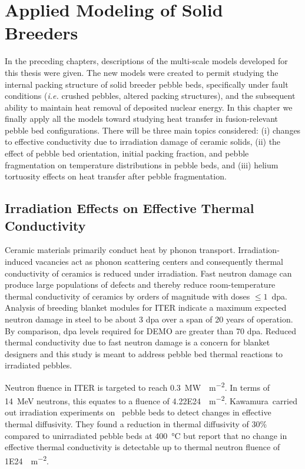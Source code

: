 \chapter{Applied Modeling of Solid Breeders}\label{sec:dem-studies}

In the preceding chapters, descriptions of the multi-scale models developed for this thesis were given. The new models were created to permit studying the internal packing structure of solid breeder pebble beds, specifically under fault conditions (\textit{i.e.} crushed pebbles, altered packing structures), and the subsequent ability to maintain heat removal of deposited nuclear energy. In this chapter we finally apply all the models toward studying heat transfer in fusion-relevant pebble bed configurations. There will be three main topics considered: (i) changes to effective conductivity due to irradiation damage of ceramic solids, (ii) the effect of pebble bed orientation, initial packing fraction, and pebble fragmentation on temperature distributions in pebble beds, and (iii) helium tortuosity effects on heat transfer after pebble fragmentation. 


\section{Irradiation Effects on Effective Thermal Conductivity}\label{sec:irradiation}
Ceramic materials primarily conduct heat by phonon transport. Irradiation-induced vacancies act as phonon scattering centers and consequently thermal conductivity of ceramics is reduced under irradiation.\cite{Hopkins1985} Fast neutron damage can produce large populations of defects and thereby reduce room-temperature thermal conductivity of ceramics by orders of magnitude with doses $\le 1$~dpa.\cite{Snead2005} Analysis of breeding blanket modules for ITER indicate a maximum expected neutron damage in steel to be about 3 dpa over a span of 20 years of operation. By comparison, dpa levels required for DEMO are greater than 70 dpa.\cite{Giancarli2006a} Reduced thermal conductivity due to fast neutron damage is a concern for blanket designers and this study is meant to address pebble bed thermal reactions to irradiated pebbles.

Neutron fluence in ITER is targeted to reach \SI{0.3}{\mega\watt\year\per\square\meter}.\cite{Abdou2015,VanHoutte2011} In terms of \SI{14}{\mega\electronvolt} neutrons, this equates to a fluence of \SI{4.22E24}{\neutron\per\meter\squared}. Kawamura\etal~carried out irradiation experiments on \lit~pebble beds to detect changes in effective thermal diffusivity. They found a reduction in thermal diffusivity of 30\% compared to unirradiated pebble beds at \SI{400}{\celsius} but report that no change in effective thermal conductivity is detectable up to thermal neutron fluence of \SI{1E24}{\neutron\per\meter\squared}. 


